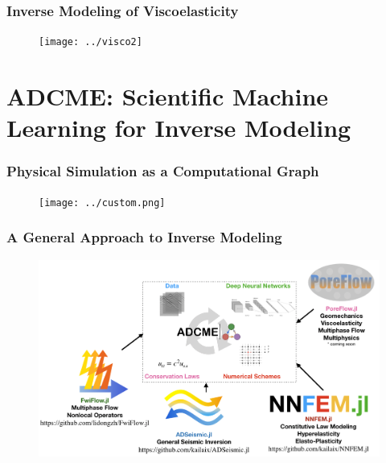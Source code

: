 \documentclass[usenames,dvipsnames]{beamer}
\begin{document}
\begin{frame}
	\frametitle{Inverse Modeling of Viscoelasticity}
	\begin{figure}[hbt]
  \texttt{[image: ../visco2]}
\end{figure}

\end{frame}


\section{ADCME: Scientific Machine Learning for Inverse Modeling}

\begin{frame}
	\frametitle{Physical Simulation as a Computational Graph}
	\begin{figure}[hbt]
		\texttt{[image: ../custom.png]}
	\end{figure}
\end{frame}

\begin{frame}
	\frametitle{A General Approach to Inverse Modeling}
	\begin{figure}[hbt]
  \includegraphics[width=1.0\textwidth]{../summary.png}
\end{figure}
%
\end{frame}


\end{document}
